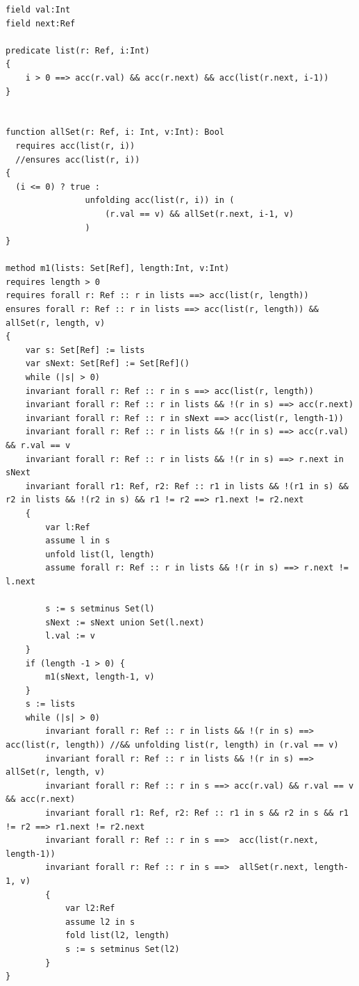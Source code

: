 \documentclass[12pt]{article}
\begin{document}
\begin{lstlisting}
field val:Int
field next:Ref

predicate list(r: Ref, i:Int)
{
    i > 0 ==> acc(r.val) && acc(r.next) && acc(list(r.next, i-1))
}


function allSet(r: Ref, i: Int, v:Int): Bool
  requires acc(list(r, i))
  //ensures acc(list(r, i))
{
  (i <= 0) ? true :
                unfolding acc(list(r, i)) in (
                    (r.val == v) && allSet(r.next, i-1, v)
                )
}

method m1(lists: Set[Ref], length:Int, v:Int)
requires length > 0
requires forall r: Ref :: r in lists ==> acc(list(r, length))
ensures forall r: Ref :: r in lists ==> acc(list(r, length)) && allSet(r, length, v)
{
    var s: Set[Ref] := lists
    var sNext: Set[Ref] := Set[Ref]()
    while (|s| > 0)
    invariant forall r: Ref :: r in s ==> acc(list(r, length))
    invariant forall r: Ref :: r in lists && !(r in s) ==> acc(r.next)
    invariant forall r: Ref :: r in sNext ==> acc(list(r, length-1))
    invariant forall r: Ref :: r in lists && !(r in s) ==> acc(r.val) && r.val == v
    invariant forall r: Ref :: r in lists && !(r in s) ==> r.next in sNext
    invariant forall r1: Ref, r2: Ref :: r1 in lists && !(r1 in s) && r2 in lists && !(r2 in s) && r1 != r2 ==> r1.next != r2.next
    {
        var l:Ref
        assume l in s
        unfold list(l, length)
        assume forall r: Ref :: r in lists && !(r in s) ==> r.next != l.next

        s := s setminus Set(l)
        sNext := sNext union Set(l.next)
        l.val := v
    }
    if (length -1 > 0) {
        m1(sNext, length-1, v)
    }
    s := lists
    while (|s| > 0)
        invariant forall r: Ref :: r in lists && !(r in s) ==> acc(list(r, length)) //&& unfolding list(r, length) in (r.val == v)
        invariant forall r: Ref :: r in lists && !(r in s) ==>  allSet(r, length, v)
        invariant forall r: Ref :: r in s ==> acc(r.val) && r.val == v && acc(r.next)
        invariant forall r1: Ref, r2: Ref :: r1 in s && r2 in s && r1 != r2 ==> r1.next != r2.next
        invariant forall r: Ref :: r in s ==>  acc(list(r.next, length-1))
        invariant forall r: Ref :: r in s ==>  allSet(r.next, length-1, v)
        {
            var l2:Ref
            assume l2 in s
            fold list(l2, length)
            s := s setminus Set(l2)
        }
}
\end{lstlisting}
\end{document}
